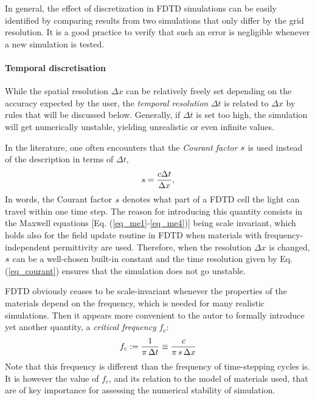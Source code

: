 In general, the effect of discretization in FDTD simulations can be easily identified by comparing results from two simulations that only differ by the grid resolution. It is a good practice to verify that such an error is negligible whenever a new simulation is tested.
\paragraph{Temporal discretisation} %
While the spatial resolution $\Delta x$ can be relatively freely set depending on the accuracy expected by the user, the \textit{temporal resolution} $\Delta t$ is related to $\Delta x$ by rules that will be discussed below. Generally, if $\Delta t$ is set too high, the simulation will get numerically unstable, yielding unrealistic or even infinite values.  %

In the literature, one often encounters that the \textit{Courant factor} $s$ is used instead of the description in terms of $\Delta t$,
\begin{equation} s = \frac{c \Delta t}{\Delta x}, \label{eq_courant}\end{equation}
In words, the Courant factor $s$ denotes what part of a FDTD cell the light can travel within one time step. 
The reason for introducing this quantity consists in the Maxwell equations [Eq. (\ref{eq_me1}-\ref{eq_me4})] being scale invariant, which holds also for the field update routine in FDTD when materials with frequency-independent permittivity are used. Therefore, when the resolution $\Delta x$ is changed, $s$ can be a well-chosen built-in constant and the time resolution given by Eq. (\ref{eq_courant}) ensures that the simulation does not go unstable.

FDTD obviously ceases to be scale-invariant whenever the properties of the materials depend on the frequency, which is needed for many realistic simulations. Then it appears more convenient to the autor to formally introduce yet another quantity, a \textit{critical frequency} $f_c$:
\begin{equation} f_c := \frac{1}{\pi \, \Delta t} \equiv \frac{c}{\pi\, s\, \Delta x} \label{eq_fc}\end{equation}
Note that this frequency is different %
than the frequency of time-stepping cycles is. It is however the value of $f_c$, and its relation to the model of materials used, that are of key importance for assessing the numerical stability of simulation. %

